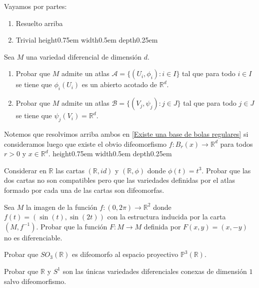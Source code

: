 \documentclass[11pt]{article}
\newcommand{\R}{{\mathbb{R}}}
\numberwithin{theorem}{subsection}
\newcommand{\qed}{\nobreak \ifvmode \relax \else
	\ifdim\lastskip<1.5em \hskip-\lastskip
	\hskip1.5em plus0em minus0.5em \fi \nobreak
	\vrule height0.75em width0.5em depth0.25em\fi}
\begin{document}
\begin{solution}
	Vayamos por partes:
	
	\begin{enumerate}
		\item Resuelto arriba
		\item Trivial \qed
	\end{enumerate}
	
\end{solution}

\begin{question}
	Sea $M$ una variedad diferencial de dimensi\'on $d$.
	\begin{enumerate}
		\item Probar que $M$ admite un atlas $\mathscr{A}=\{(U_i,\phi_i):i\in I\}$ tal que para todo $i\in I$ se tiene que $\phi_i(U_i)$ es un abierto acotado de $\R^d$.
		\item Probar que $M$ admite un atlas $\mathscr{B}=\{(V_j,\psi_j):j\in J\}$ tal que para todo $j\in J$ se tiene que $\psi_j(V_i)=\R^d$.
	\end{enumerate}
\end{question}

\begin{solution}
	Notemos que resolvimos arriba ambos en \ref{Existe una base de bolas regulares} si consideramos luego que existe el obvio difeomorfismo $f : B_r(x) \rightarrow \R^d$ para todos $r> 0 $ y $x \in \R^d$. \qed
\end{solution}

\begin{question}
	Considerar en $\R$ las cartas $(\R,id)$ y $(\R,\phi)$ donde $\phi(t)=t^3$. Probar que las dos cartas no son compatibles pero que las variedades definidas por el atlas formado por cada una de las cartas son difeomorfas.
\end{question}

\begin{question}
	Sea $M$ la imagen de la funci\'on $f:(0,2\pi)\to\R^2$ donde $f(t)=(\sin(t),\sin(2t))$ con la estructura inducida por la carta $(M,f^{-1})$. Probar que la funci\'on $F:M\to M$ definida por $F(x,y)=(x,-y)$ no es diferenciable.
	
\end{question}

\begin{question}
	Probar que $SO_3(\R)$ es difeomorfo al espacio proyectivo $\mathbb{P}^3(\R)$.
\end{question}

\begin{question}
	Probar que $\R$ y $S^1$ son las \'unicas variedades diferenciales conexas de dimensi\'on $1$ salvo difeomorfismo.
\end{question}
\end{document}
